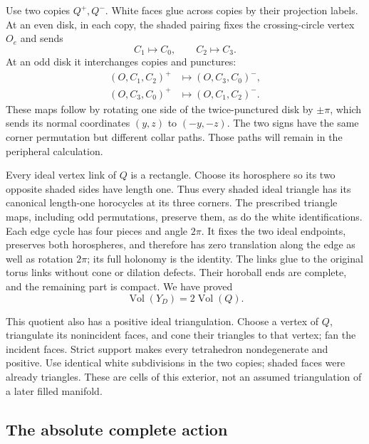 \documentclass[11pt]{article}
\numberwithin{equation}{section}
\theoremstyle{definition}
\theoremstyle{remark}
\newcommand{\Vol}{\operatorname{Vol}}
\begin{document}
Use two copies \(Q^+,Q^-\). White faces glue across copies by their
projection labels. At an even disk, in each copy, the shaded pairing fixes
the crossing-circle vertex \(O_e\) and sends
\begin{equation}\label{mf:even-corners}
                   C_1\longmapsto C_0,\qquad C_2\longmapsto C_3.
\end{equation}
At an odd disk it interchanges copies and punctures:
\begin{equation}\label{mf:odd-corners}
\begin{aligned}
 (O,C_1,C_2)^+&\longmapsto(O,C_3,C_0)^-,\\
 (O,C_3,C_0)^+&\longmapsto(O,C_1,C_2)^- .
\end{aligned}
\end{equation}
These maps follow by rotating one side of the twice-punctured disk
by \(\pm\pi\), which sends its normal coordinates \((y,z)\) to
\((-y,-z)\). The two signs have the same corner permutation but
different collar paths. Those paths will remain in the peripheral
calculation.

Every ideal vertex link of \(Q\) is a rectangle. Choose its horosphere
so its two opposite shaded sides have length one. Thus every shaded
ideal triangle has its canonical length-one horocycles at its three
corners. The prescribed triangle maps, including odd permutations,
preserve them, as do the white identifications. Each edge cycle has
four pieces and angle \(2\pi\). It fixes the two ideal endpoints,
preserves both horospheres, and therefore has zero translation along
the edge as well as rotation \(2\pi\); its full holonomy is the identity.
The links glue to the original torus links without cone or dilation
defects. Their horoball ends are complete, and the remaining part is
compact. We have proved
\begin{equation}\label{mf:complete-volume}
                         \Vol(Y_D)=2\Vol(Q).
\end{equation}

This quotient also has a positive ideal triangulation. Choose a vertex
of \(Q\), triangulate its nonincident faces, and cone their triangles
to that vertex; fan the incident faces. Strict support makes every
tetrahedron nondegenerate and positive. Use identical white
subdivisions in the two copies; shaded faces were already triangles.
These are cells of this exterior, not an assumed triangulation of a
later filled manifold.

\subsection{The absolute complete action}
\end{document}
